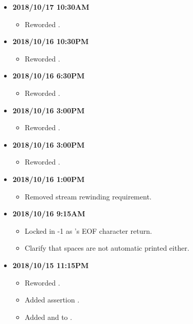 \documentclass[../gazprea.tex]{subfiles}
\begin{document}
\begin{itemize}
  \item
    \textbf{2018/10/17 10:30AM}
    \begin{itemize}
      \item Reworded .
    \end{itemize}
  \item
    \textbf{2018/10/16 10:30PM}
    \begin{itemize}
      \item Reworded .
    \end{itemize}
  \item
    \textbf{2018/10/16 6:30PM}
    \begin{itemize}
      \item Reworded .
    \end{itemize}
  \item
    \textbf{2018/10/16 3:00PM}
    \begin{itemize}
      \item Reworded .
    \end{itemize}
  \item
    \textbf{2018/10/16 3:00PM}
    \begin{itemize}
      \item Reworded .
    \end{itemize}
  \item
    \textbf{2018/10/16 1:00PM}
    \begin{itemize}
      \item Removed stream rewinding requirement.
    \end{itemize}
  \item
    \textbf{2018/10/16 9:15AM}
    \begin{itemize}
      \item Locked in -1 as 's EOF character return.
      \item Clarify that spaces are not automatic printed either.
    \end{itemize}
  \item
    \textbf{2018/10/15 11:15PM}
    \begin{itemize}
      \item Reworded .
      \item Added assertion .
      \item Added  and  to .

\end{itemize}
\end{itemize}
\end{document}
